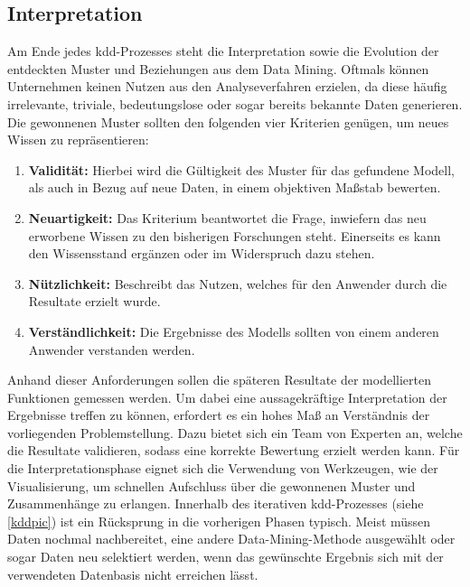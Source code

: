 \subsection{Interpretation}
Am Ende jedes \gls{kdd}-Prozesses steht die Interpretation sowie die Evolution der entdeckten Muster und Beziehungen aus dem Data Mining. Oftmals können Unternehmen keinen Nutzen aus den Analyseverfahren erzielen, da diese häufig irrelevante, triviale, bedeutungslose oder sogar bereits bekannte Daten generieren. Die gewonnenen Muster sollten den folgenden vier Kriterien genügen, um neues Wissen zu repräsentieren:

\begin{enumerate}
\item \textbf{Validität:} Hierbei wird die Gültigkeit des Muster für das gefundene Modell, als auch in Bezug auf neue Daten, in einem objektiven Maßstab bewerten.
\item \textbf{Neuartigkeit:} Das Kriterium beantwortet die Frage, inwiefern das neu erworbene Wissen zu den bisherigen Forschungen steht. Einerseits es kann den Wissensstand ergänzen oder im Widerspruch dazu stehen.
\item \textbf{Nützlichkeit:} Beschreibt das Nutzen, welches für den Anwender durch die Resultate erzielt wurde.
\item \textbf{Verständlichkeit:} Die Ergebnisse des Modells sollten von einem anderen Anwender verstanden werden.
\end{enumerate}

Anhand dieser Anforderungen sollen die späteren Resultate der modellierten Funktionen gemessen werden. Um dabei eine aussagekräftige Interpretation der Ergebnisse treffen zu können, erfordert es ein hohes Maß an Verständnis der vorliegenden Problemstellung. Dazu bietet sich ein Team von Experten an, welche die Resultate validieren, sodass eine korrekte Bewertung erzielt werden kann. Für die Interpretationsphase eignet sich die Verwendung von Werkzeugen, wie der Visualisierung, um schnellen Aufschluss über die gewonnenen Muster und Zusammenhänge zu erlangen. Innerhalb des iterativen \gls{kdd}-Prozesses (siehe \vref{kddpic}) ist ein Rücksprung in die vorherigen Phasen typisch. Meist müssen Daten nochmal nachbereitet, eine andere Data-Mining-Methode ausgewählt oder sogar Daten neu selektiert werden, wenn das gewünschte Ergebnis sich mit der verwendeten Datenbasis nicht erreichen lässt.